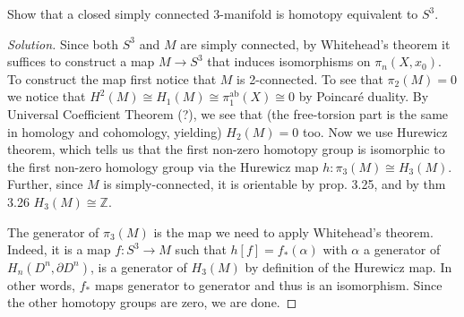 \documentclass{article}
\numberwithin{equation}{section}
\newcommand{\Z}{\mathbb{Z}}
\begin{document}
\iffalse\begin{remark}
	About Riemann surfaces
	
		\[\begin{tikzcd}
		\widetilde{U\backslash x}\arrow[d,swap,"p"]\arrow[r,"\tilde{f}"]&\widetilde{W\backslash y}\arrow[d,"q"]\\
		U\backslash x\arrow[r,"f",swap]&W\backslash y
	\end{tikzcd}\qquad\qquad
	\begin{tikzcd}
		\pi_i(\tilde{X})\arrow[r,"\tilde{f}_*"]\arrow[d,swap,"p_*"]\arrow[d,"\cong"]&\pi_i(\tilde{Y})\arrow[d,"q_*"]\arrow[d,swap,"\cong"]\\
		\pi_i(X)\arrow[r,"f_*",swap]\arrow[r,"\cong"]&\pi_i(Y)
	\end{tikzcd}\qquad i\geq2\]
\end{remark}\fi

\begin{exercise}[4.2.15]
	Show that a closed simply connected 3-manifold is homotopy equivalent to $S^3$.
\end{exercise}
\begin{proof}[Solution]
	Since both $S^3$  and $M$ are simply connected, by Whitehead's theorem it suffices to construct a map $M\to S^3$ that induces isomorphisms on $\pi_n(X,x_0)$. To construct the map first notice that $M$ is 2-connected. To see that $\pi_2(M)=0$ we notice that $H^2(M)\cong H_1(M)\cong \pi_1^{\operatorname{ab}}(X)\cong 0$ by Poincar\'e duality. By Universal Coefficient Theorem {\color{magenta}(?)}, we see that {\color{magenta}(the free-torsion part is the same in homology and cohomology, yielding)} $H_2(M)=0$ too. Now we use Hurewicz theorem, which tells us that the first non-zero homotopy group is isomorphic to the first non-zero homology group via the Hurewicz map $h:\pi_3(M)\cong H_3(M)$. Further, since $M$  is simply-connected, it is orientable by prop. 3.25, and by thm 3.26 $H_3(M)\cong \Z$.

	The generator of $\pi_3(M)$ is the map we need to apply Whitehead's theorem. Indeed, it is a map $f:S^3\to M$ such that $h[f]=f_*(\alpha)$ with $\alpha$ a generator of $H_n(D^n,\partial D^n)$, is a generator of $H_3(M)$ by definition of the Hurewicz map. In other words, $f_*$ maps generator to generator and thus is an isomorphism. Since the other homotopy groups are zero, we are done.
\end{proof}
\end{document}
